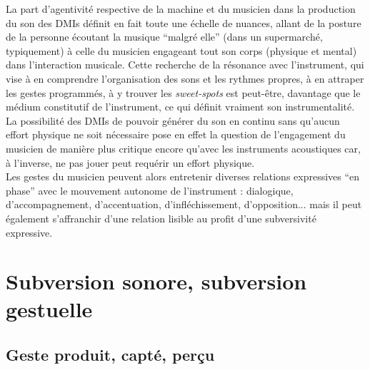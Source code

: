 \indent La part d'agentivité respective de la machine et du musicien dans la production du son des \glspl{DMI} définit en fait toute une échelle de nuances, allant de la posture de la personne écoutant la musique ``malgré elle'' (dans un supermarché, typiquement) à celle du musicien engageant tout son corps (physique et mental) dans l'interaction musicale. Cette recherche de la résonance avec l'instrument, qui vise à en comprendre l'organisation des sons et les rythmes propres, à en attraper les gestes programmés, à y trouver les \textit{sweet-spots} est peut-être, davantage que le médium constitutif de l'instrument, ce qui définit vraiment son instrumentalité. La possibilité des \glspl{DMI} de pouvoir générer du son en continu sans qu'aucun effort physique ne soit nécessaire pose en effet la question de l'engagement du musicien de manière plus critique encore qu'avec les instruments acoustiques car, à l'inverse, ne pas jouer peut requérir un effort physique.\\
\indent Les gestes du musicien peuvent alors entretenir diverses relations expressives ``en phase'' avec le mouvement autonome de l'instrument : dialogique, d'accompagnement, d'accentuation, d'infléchissement, d'opposition... mais il peut également s'affranchir d'une relation lisible au profit d'une subversivité expressive.




\section{Subversion sonore, subversion gestuelle}
\label{sec:gesture:subversion}

\subsection{Geste produit, capté, perçu}

